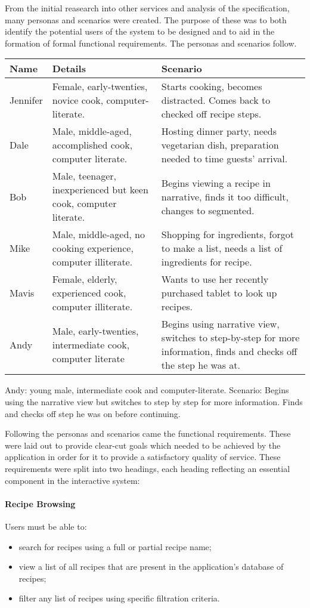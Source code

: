 From the initial reasearch into other services and analysis of the specification, many personas and scenarios were created. The purpose of these was to both identify the potential users of the system to be designed and to aid in the formation of formal functional requirements. The personas and scenarios follow.
\begin{center}
\begin{tabularx}{\textwidth}{|X|X|X|}
\hline
Name & Details & Scenario \\ \hline
Jennifer & Female, early-twenties, novice cook, computer-literate. & Starts cooking, becomes distracted. Comes back to checked off recipe steps. \\ \hline
Dale & Male, middle-aged, accomplished cook, computer literate. & Hosting dinner party, needs vegetarian dish, preparation needed to time guests' arrival. \\ \hline
Bob & Male, teenager, inexperienced but keen cook, computer literate. & Begins viewing a recipe in narrative, finds it too difficult, changes to segmented. \\ \hline
Mike & Male, middle-aged, no cooking experience, computer illiterate. & Shopping for ingredients, forgot to make a list, needs a list of ingredients for recipe. \\ \hline
Mavis & Female, elderly, experienced cook, computer illiterate. & Wants to use her recently purchased tablet to look up recipes. \\ \hline
Andy & Male, early-twenties, intermediate cook, computer literate & Begins using narrative view, switches to step-by-step for more information, finds and checks off the step he was at. \\
\hline
\end{tabularx}
\end{center}
Andy: young male, intermediate cook and computer-literate.
Scenario: Begins using the narrative view but switches to step by step for more information. Finds and checks off step he was on before continuing.

Following the personas and scenarios came the functional requirements. These were laid out to provide clear-cut goals which needed to be achieved by the application in order for it to provide a satisfactory quality of service. These requirements were split into two headings, each heading reflecting an essential component in the interactive system:

\paragraph{Recipe Browsing}
Users must be able to:
\begin{itemize}
\item search for recipes using a full or partial recipe name;
\item view a list of all recipes that are present in the application's database of recipes;
\item filter any list of recipes using specific filtration criteria.
\end{itemize}

